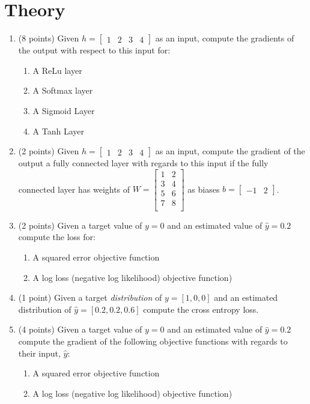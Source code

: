 \documentclass[12pt]{article}
\begin{document}
\newpage
\section{Theory}
\begin{enumerate}
\item (8 points) Given $h=\begin{bmatrix}1 & 2 & 3 & 4\end{bmatrix}$ as an input, compute the gradients of the output with respect to this input for:
	\begin{enumerate}
	\item A ReLu layer
	\item A Softmax layer
	\item A Sigmoid Layer
	\item A Tanh Layer
	\end{enumerate}

\item (2 points) Given $h=\begin{bmatrix}1 & 2 & 3 & 4\end{bmatrix}$ as an input, compute the gradient of the output a fully connected layer with regards to this input if the fully connected layer has weights of $W=\begin{bmatrix}
1 & 2\\
3 & 4\\
5 & 6\\
7 & 8\\
\end{bmatrix}$  as biases $b=\begin{bmatrix}-1 & 2\end{bmatrix}$.

\item (2 points) Given a target value of $y=0$ and an estimated value of $\hat{y}=0.2$ compute the loss for:
\begin{enumerate}
\item A squared error objective function
\item A log loss (negative log likelihood) objective function)
\end{enumerate}

\item (1 point) Given a target \emph{distribution} of $y=[1, 0, 0]$ and an estimated distribution of $\hat{y}=[0.2, 0.2, 0.6]$ compute the cross entropy loss.

\item (4 points) Given a target value of $y=0$ and an estimated value of $\hat{y}=0.2$ compute the gradient of the following objective functions with regards to their input, $\hat{y}$:
\begin{enumerate}
\item A squared error objective function
\item A log loss (negative log likelihood) objective function)
\end{enumerate}


\end{enumerate}
\end{document}

